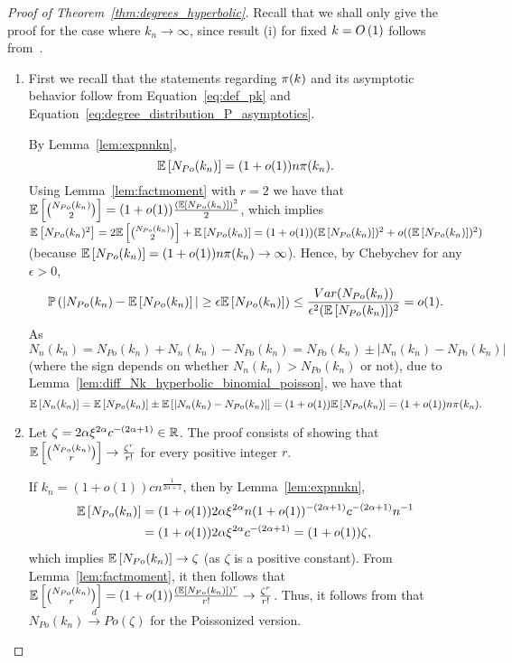 \begin{proof}[Proof of Theorem~\ref{thm:degrees_hyperbolic}] 

Recall that we shall only give the proof for the case where $k_n \to \infty$, since result (i) for fixed $k = O\left(1\right)$ follows from~\cite{gugelmann2012random}.

\begin{enumerate}[\upshape (i)]
\item  First we recall that the statements regarding ${\pi}(k)$ and its asymptotic behavior follow from Equation~\ref{eq:def_pk} and Equation~\ref{eq:degree_distribution_P_asymptotics}.

By Lemma~\ref{lem:expnnkn},
\[
\mathbb{E}\left[{ N_{Po}(k_n) }\right]=(1+o(1))n {\pi}(k_n).
\]
Using Lemma~\ref{lem:factmoment} with $r=2$ we have that $\mathbb{E}\left[{N_{Po}(k_n) \choose 2}\right] = (1+o(1))\frac{(\mathbb{E}\left[ N_{Po}(k_n)\right])^2}{2}$, which implies $\mathbb{E}\left[N_{Po}(k_n)^2\right] = 2\mathbb{E}\left[{N_{Po}(k_n) \choose 2}\right] +\mathbb{E}\left[N_{Po}(k_n)\right] = (1+o(1))(\mathbb{E}\left[ N_{Po}(k_n)\right])^2 +o((\mathbb{E}\left[N_{Po}(k_n)\right])^2)$ (because $\mathbb{E}\left[N_{Po}(k_n)\right] = (1+o(1)) n{\pi}(k_n) \rightarrow \infty$). Hence, by Chebychev for any $\epsilon >0$,
\[
	\mathbb{P}\left(|N_{Po}(k_n)-\mathbb{E}\left[N_{Po}(k_n)\right]|\geq \epsilon \mathbb{E}\left[N_{Po}(k_n)\right]\right)
	\leq \frac{Var(N_{Po}(k_n))}{\epsilon^2 (\mathbb{E}\left[ N_{Po}(k_n)\right])^2} = o(1).
\]
As $N_n(k_n)=N_{Po}(k_n)+N_n(k_n)-N_{Po}(k_n) = N_{Po}(k_n)\pm |N_n(k_n)-N_{Po}(k_n)|$ (where the sign depends on whether $N_n(k_n)>N_{Po}(k_n)$ or not), due to Lemma~\ref{lem:diff_Nk_hyperbolic_binomial_poisson}, we have that
\[
	\mathbb{E}\left[N_n(k_n)\right] = \mathbb{E}\left[N_{Po}(k_n)\right] \pm \mathbb{E}\left[ |N_n(k_n)-N_{Po}(k_n)|\right] = (1+o(1))\mathbb{E}\left[N_{Po}(k_n)\right] = (1+o(1))n {\pi}(k_n).
\]

\item Let $\zeta = 2\alpha \xi^{2\alpha}c^{-(2\alpha+1)} \in {\ensuremath{\mathbb R}}$.
The proof consists of showing that $\mathbb{E}\left[{N_{Po}(k_n) \choose r} \right] \rightarrow \frac{\zeta^r}{r!}$ for every positive integer $r$.%

If $k_n=(1+o(1))c n^{\frac{1}{2\alpha+1}}$, then by Lemma~\ref{lem:expnnkn},
\begin{align*}
	\mathbb{E}\left[N_{Po}(k_n)\right] &= (1+o(1))2\alpha \xi^{2\alpha} n (1+o(1))^{-(2\alpha+1)} c^{-(2\alpha+1)}n^{-1} \\
	&= (1+o(1))2\alpha \xi^{2\alpha} c^{-(2\alpha+1)}=(1+o(1))\zeta,
\end{align*}
which implies $\mathbb{E}\left[N_{Po}(k_n)\right] \rightarrow \zeta$ (as $\zeta$ is a positive constant). From Lemma~\ref{lem:factmoment}, it then follows that $\mathbb{E}\left[{N_{Po}(k_n) \choose r}\right] =(1+o(1))\frac{(\mathbb{E}\left[ N_{Po}(k_n)\right])^r}{r!}\rightarrow \frac{\zeta^r}{r!}$. Thus, it follows from \cite[Theorem 8.3.1]{alon2016probabilistic} that $N_{Po}(k_n) \xrightarrow{d} Po(\zeta)$ for the Poissonized version.


\end{enumerate}
\end{proof}

